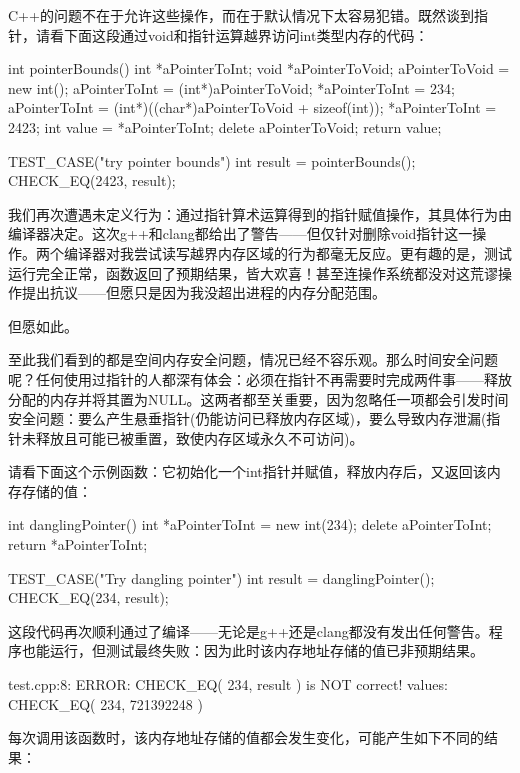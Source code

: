 C++的问题不在于允许这些操作，而在于默认情况下太容易犯错。既然谈到指针，请看下面这段通过void和指针运算越界访问int类型内存的代码：

\begin{cpp}
int pointerBounds() {
  int *aPointerToInt;
  void *aPointerToVoid;
  aPointerToVoid = new int();
  aPointerToInt = (int*)aPointerToVoid;
  *aPointerToInt = 234;
  aPointerToInt = (int*)((char*)aPointerToVoid + sizeof(int));
  *aPointerToInt = 2423;
  int value = *aPointerToInt;
  delete aPointerToVoid;
  return value;
}

TEST_CASE("try pointer bounds"){
  int result = pointerBounds();
  CHECK_EQ(2423, result);
}
\end{cpp}

我们再次遭遇未定义行为：通过指针算术运算得到的指针赋值操作，其具体行为由编译器决定。这次g++和clang都给出了警告——但仅针对删除void指针这一操作。两个编译器对我尝试读写越界内存区域的行为都毫无反应。更有趣的是，测试运行完全正常，函数返回了预期结果，皆大欢喜！甚至连操作系统都没对这荒谬操作提出抗议——但愿只是因为我没超出进程的内存分配范围。

但愿如此。

至此我们看到的都是空间内存安全问题，情况已经不容乐观。那么时间安全问题呢？任何使用过指针的人都深有体会：必须在指针不再需要时完成两件事——释放分配的内存并将其置为NULL。这两者都至关重要，因为忽略任一项都会引发时间安全问题：要么产生悬垂指针(仍能访问已释放内存区域)，要么导致内存泄漏(指针未释放且可能已被重置，致使内存区域永久不可访问)。

请看下面这个示例函数：它初始化一个int指针并赋值，释放内存后，又返回该内存存储的值：

\begin{cpp}
int danglingPointer() {
  int *aPointerToInt = new int(234);
  delete aPointerToInt;
  return *aPointerToInt;
}

TEST_CASE("Try dangling pointer"){
  int result = danglingPointer();
  CHECK_EQ(234, result);
}
\end{cpp}

这段代码再次顺利通过了编译——无论是g++还是clang都没有发出任何警告。程序也能运行，但测试最终失败：因为此时该内存地址存储的值已非预期结果。

\begin{shell}
test.cpp:8: ERROR: CHECK_EQ( 234, result ) is NOT correct!
  values: CHECK_EQ( 234, 721392248 )
\end{shell}

每次调用该函数时，该内存地址存储的值都会发生变化，可能产生如下不同的结果：

